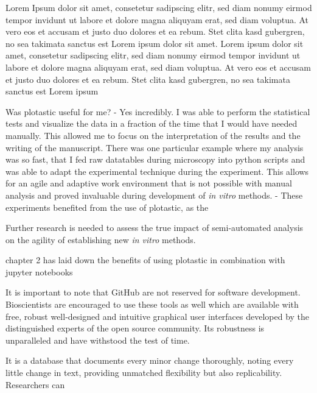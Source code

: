 Lorem Ipsum dolor sit amet, consetetur sadipscing elitr, sed diam nonumy
eirmod tempor invidunt ut labore et dolore magna aliquyam erat, sed diam
voluptua. At vero eos et accusam et justo duo dolores et ea rebum. Stet
clita kasd gubergren, no sea takimata sanctus est Lorem ipsum dolor sit
amet. Lorem ipsum dolor sit amet, consetetur sadipscing elitr, sed diam
nonumy eirmod tempor invidunt ut labore et dolore magna aliquyam erat,
sed diam voluptua. At vero eos et accusam et justo duo dolores et ea
rebum. Stet clita kasd gubergren, no sea takimata sanctus est Lorem
ipsum

Was plotastic useful for me?
- Yes incredibly. I was able to perform the statistical tests and
visualize the data in a fraction of the time that I would have needed
manually. This allowed me to focus on the interpretation of the results
and the writing of the manuscript.
There was one particular example where my analysis was so fast, that I
fed raw datatables during microscopy into python scripts and was able to
adapt the experimental technique during the experiment. This allows for
an agile and adaptive work environment that is not possible with manual
analysis and proved invaluable during development of  \textit{in
    vitro} methods.
- These experiments benefited from the use of plotastic, as the

Further research is needed to assess the true impact of semi-automated
analysis on the agility of establishing new \textit{in vitro} methods.


\label{dis:plotastic_jupyter}


\label{dis:code_quality}
chapter 2 has laid down the benefits of using plotastic in combination with jupyter notebooks


It is important to note that  GitHub are not reserved for software development.
Bioscientists are encouraged to use these tools as well which are available with
free, robust well-designed and intuitive graphical user interfaces developed by
the distinguished experts of the open source community. Its robustness is
unparalleled and have withstood the test of time.

It is a database that documents every minor change thoroughly, noting every little
change in text, providing unmatched flexibility but also replicability.
Researchers can 


